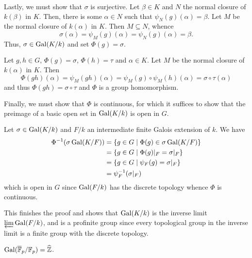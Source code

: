 Lastly, we must show that $\sigma$ is surjective. Let $\beta\in K$ and $N$ the normal closure of $k(\beta)$ in $K$. Then, there is some $\alpha\in N$ such that $\psi_N(g)(\alpha) = \beta$. Let $M$ be the normal closure of $k(\alpha)$ in $K$. Then $M\subseteq N$, whence 
\begin{equation*}
    \sigma(\alpha) = \psi_M(g)(\alpha) = \psi_N(g)(\alpha) = \beta.
\end{equation*}
Thus, $\sigma\in\operatorname{Gal}(K/k)$ and set $\Phi(g) = \sigma$.

Let $g,h\in G$, $\Phi(g) = \sigma$, $\Phi(h) = \tau$ and $\alpha\in K$. Let $M$ be the normal closure of $k(\alpha)$ in $K$. Then 
\begin{equation*}
    \Phi(gh)(\alpha) = \psi_M(gh)(\alpha) = \psi_M(g)\circ\psi_M(h)(\alpha) = \sigma\circ\tau(\alpha)
\end{equation*}
and thus $\Phi(gh) = \sigma\circ\tau$ and $\Phi$ is a group homomorphism.

Finally, we must show that $\Phi$ is continuous, for which it suffices to show that the preimage of a basic open set in $\operatorname{Gal}(K/k)$ is open in $G$.

Let $\sigma\in\operatorname{Gal}(K/k)$ and $F/k$ an intermediate finite Galois extension of $k$. We have 
\begin{align*}
    \Phi^{-1}(\sigma\operatorname{Gal}(K/F)) &= \{g\in G\mid \Phi(g)\in\sigma\operatorname{Gal}(K/F)\}\\
    &= \{g\in G\mid \Phi(g)|_F = \sigma|_F\}\\
    &= \{g\in G\mid \psi_F(g) = \sigma|_F\}\\
    &= \psi_F^{-1}(\sigma|_F)
\end{align*}
which is open in $G$ since $\operatorname{Gal}(F/k)$ has the discrete topology whence $\Phi$ is continuous. 

This finishes the proof and shows that $\operatorname{Gal}(K/k)$ is the inverse limit $\varprojlim\operatorname{Gal}(F/k)$, and is a profinite group since every topological group in the inverse limit is a finite group with the discrete topology.

\begin{corollary}
    $\operatorname{Gal}(\overline{\mathbb F}_p/\mathbb F_p) = \widehat{\mathbb{Z}}$.
\end{corollary}